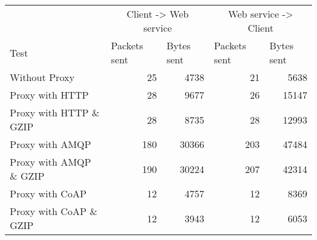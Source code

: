 \begin{tabular}{lrrrr}
\hline
\multicolumn{1}{l}{}                  & \multicolumn{2}{c}{Client -> Web service}                           & \multicolumn{2}{c}{Web service -> Client}                           \\
\multicolumn{1}{l}{Test} & \multicolumn{1}{l}{Packets sent} & \multicolumn{1}{l}{Bytes sent} & \multicolumn{1}{l}{Packets sent} & \multicolumn{1}{l}{Bytes sent} \\ \hline
Without Proxy                   & 25             & 4738           & 21             & 5638           \\
Proxy with HTTP                 & 28             & 9677           & 26             & 15147          \\
Proxy with HTTP \& GZIP         & 28             & 8735           & 28             & 12993          \\
Proxy with AMQP                 & 180            & 30366          & 203            & 47484          \\
Proxy with AMQP \& GZIP         & 190            & 30224          & 207            & 42314          \\
Proxy with CoAP                 & 12             & 4757           & 12             & 8369           \\
Proxy with CoAP \& GZIP         & 12             & 3943           & 12             & 6053           \\
\end{tabular}

